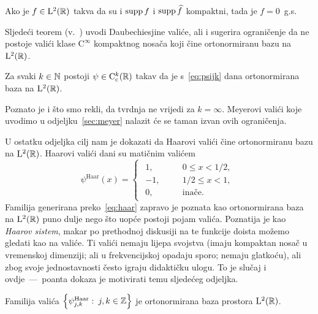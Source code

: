 \documentclass[main.tex]{subfiles}
\newcommand{\mr}[1]{\mathrm{#1}}
\begin{document}
\begin{teorem}
	Ako je \( f \in \mathrm{L}^2(\mathbb{R}) \) takva da su i \( \operatorname{supp} f \)
	i \( \operatorname{supp} \widehat{f} \) kompaktni, tada je \( f=0 \)~g.s.
\end{teorem}
Sljedeći teorem (v.~\cite{daub2}) uvodi Daubechiesjine valiće, ali i sugerira ograničenje
da ne postoje valići klase \( \mr C^\infty \) kompaktnog nosača
koji čine ortonormiranu bazu na \( \mathrm{L}^2(\mathbb{R}) \).
\begin{teorem}
	Za svaki \( k \in \mathbb{N} \) postoji \( \psi \in \mr C_\mrc ^k(\R) \)
	takav da je s~\eqref{eq:psijk} dana
	ortonormirana baza na \( \mathrm{L}^2(\mathbb{R}) \).
\end{teorem}
Poznato je i što smo rekli, da tvrdnja ne vrijedi za \( k = \infty \).
Meyerovi valići koje uvodimo u odjeljku~\ref{sec:meyer}
nalazit će se taman izvan ovih ograničenja.

\bigskip
\newcommand{\psh}{\psi^{\mathrm{Haar}}}
U ostatku odjeljka cilj nam je dokazati da Haarovi valići čine ortonormiranu bazu
na \( \mathrm{L}^2(\mathbb{R}) \). Haarovi valići dani su matičnim valićem
\begin{equation}\label{eq:haar}
	\psi^{\mathrm{Haar}}(x) = \begin{cases}\begin{aligned}
			1,  & \quad & 0 \le x < 1/2, \\
			-1, & \quad & 1/2 \le x < 1, \\
			0,  & \quad & \text{inače}.
		\end{aligned}\end{cases}
\end{equation}
Familija generirana preko~\eqref{eq:haar} zapravo je poznata
kao ortonormirana baza na \( \mathrm{L}^2(\mathbb{R}) \) puno dulje nego što uopće postoji pojam valića.
Poznatija je kao \emph{Haarov sistem}, makar po prethodnoj diskusiji na te funkcije
doista možemo gledati kao na valiće. Ti valići nemaju lijepa svojstva (imaju
kompaktan nosač u vremenskoj dimenziji; ali u frekvencijskoj opadaju sporo;
nemaju glatkoću), ali zbog svoje jednostavnosti često igraju didaktičku ulogu.
To je slučaj i ovdje~---~poanta dokaza je motivirati temu sljedećeg odjeljka.

\begin{teorem}\label{tm:haar}
	Familija valića \( \left\{ \psh_{j,k} \st j,k \in \Z \right\} \)
	je ortonormirana baza prostora \( \mathrm{L}^2(\mathbb{R}) \).
\end{teorem}
\end{document}
